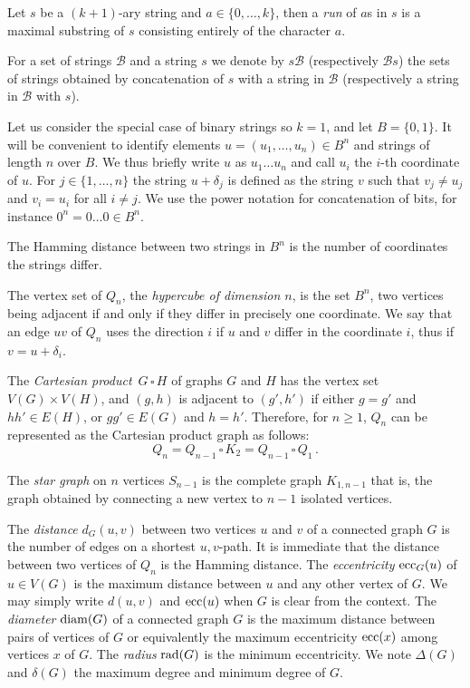 \documentclass[11pt]{article}
\newcommand{\diam}{{\rm diam}}
\newcommand{\rad}{{\rm rad}}
\newcommand{\ecc}{{\rm ecc}}
\newcommand{\B}{{\mathcal B}}
\def\cp{\,\square\,}
\begin{document}
Let $s$ be a $(k+1)$-ary  string and  $a\in\{0,\ldots,k\}$, then a \emph{run} of $a$s in $s$ is a maximal  substring of $s$ consisting entirely of the character $a$.
 
For a set of strings $\B$ and a string $s$ we denote by $s\B$ (respectively $\B s$) the sets of strings obtained by concatenation of $s$ with a string in $\B$ (respectively a string in $\B$ with $s$).

Let us consider the special case of binary strings so $k=1$, and let $B=\{0,1\}$. It will be convenient to identify elements $u = (u_1,\ldots, u_n)\in B^n$ and strings of length $n$ over $B$. We thus  briefly write $u$ as $u_1\ldots u_n$ and call $u_i$ the $i$-th coordinate of $u$. For $j\in\{1,\ldots,n\}$ the string  $u+\delta_j$ is defined as the string $v$ such that $v_j\neq u_j$ and $v_i=u_i$ for all $i\neq j$.
We use the power notation for concatenation of bits, for instance $0^n = 0\ldots 0\in B^n$. 

The Hamming distance between two strings in $B^n$ is the number of coordinates the strings differ.

The vertex set of $Q_n$, the \emph{hypercube of dimension $n$},  is the set $B^n$, two vertices being adjacent if and only if they differ in precisely one coordinate. We  say that an edge $uv$ of $Q_n$ uses the direction $i$ if $u$ and $v$ differ in the coordinate $i$, thus if $v=u+\delta_i$. 

The {\em Cartesian product}\ $G \cp H$ of graphs $G$ and $H$ has the vertex set $V(G) \times V(H)$, and $(g,h)$ is adjacent to $(g',h')$ if either $g = g'$ and $hh' \in E(H)$, or $gg' \in E(G)$ and  $h = h'$. Therefore, for $n\geq 1$,  $Q_n$ can be represented as the Cartesian product graph as follows: 
$$ Q_n=Q_{n-1}\cp K_2=Q_{n-1}\cp Q_1\,.$$

The \emph{star graph} on $n$ vertices $S_{n-1}$ is the complete graph $K_{1,n-1}$ that is, the  graph obtained by connecting a new vertex to  $n-1$ isolated vertices.



The {\em distance} $d_G(u,v)$ between two vertices $u$ and $v$ of a connected graph $G$ is the 
number of edges on a shortest $u,v$-path. It is immediate that the distance between two vertices of $Q_n$ is the Hamming distance.
The {\em eccentricity} $\ecc_G(u)$  of $u\in V(G)$ is 
the maximum distance between $u$ and any other vertex of $G$. We may simply write 
$d(u,v)$ and $\ecc (u)$ when $G$ is clear from the context. 
The {\em diameter}  $\diam(G)$ of a connected graph $G$ is the maximum distance between pairs  of vertices of $G$ or equivalently the maximum eccentricity $\ecc (x)$ among vertices $x$ of $G$. 
The {\em radius} $\rad(G) $ is the minimum  eccentricity. We note $\Delta(G)$ and $\delta(G)$ the maximum degree and minimum degree of $G$.
\end{document}
